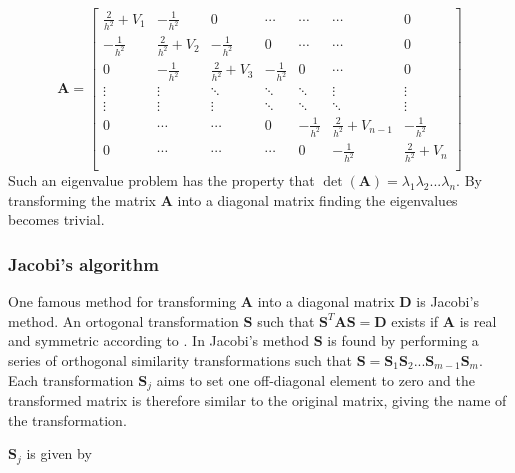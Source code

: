 \documentclass{article}
\begin{document}
\begin{equation}
\bm{A}=
\begin{bmatrix}
\frac{2}{h^2} + V_1 & -\frac{1}{h^2}      & 0                   & \cdots         & \cdots         & \cdots                  & 0      \\
-\frac{1}{h^2}      & \frac{2}{h^2} + V_2 & -\frac{1}{h^2}      & 0              & \cdots         & \cdots                  & 0      \\
0                   & -\frac{1}{h^2}      & \frac{2}{h^2} + V_3 & -\frac{1}{h^2} & 0              & \cdots                  & 0      \\
\vdots              & \vdots              & \ddots              & \ddots         & \ddots         & \vdots                  & \vdots \\
\vdots              & \vdots              & \vdots              & \ddots         & \ddots         & \ddots                  & \vdots \\
0                   & \cdots              & \cdots              & 0              & -\frac{1}{h^2} & \frac{2}{h^2} + V_{n-1} & -\frac{1}{h^2} \\
0                   & \cdots              & \cdots              & \cdots         & 0              & -\frac{1}{h^2}          & \frac{2}{h^2} + V_n    \\
\end{bmatrix}
\end{equation}
Such an eigenvalue problem has the property that $\det(\bm{A})=\lambda_1\lambda_2...\lambda_n$. By transforming the matrix $\bm{A}$ into a diagonal matrix finding the eigenvalues becomes trivial. 

\subsubsection{Jacobi's algorithm}
One famous method for transforming $\bm{A}$ into a diagonal matrix $\bm{D}$ is Jacobi's method. An ortogonal transformation $\bm{S}$ such that $\bm{S}^T\bm{A}\bm{S}=\bm{D}$ exists if $\bm{A}$ is real and symmetric according to \cite{lectures}. In Jacobi's method $\bm{S}$ is found by performing a series of orthogonal similarity transformations such that $\bm{S}=\bm{S}_1\bm{S}_2...\bm{S}_{m-1}\bm{S}_m$. Each transformation $\bm{S}_j$ aims to set one off-diagonal element to zero and the transformed matrix is therefore similar to the original matrix, giving the name of the transformation.

$\bm{S}_j$ is given by
\end{document}
